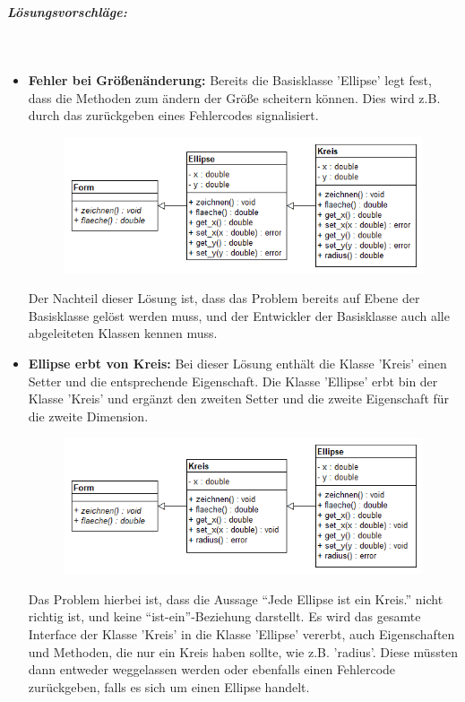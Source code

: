 				\subparagraph*{Lösungsvorschläge:}\mbox{}\\
					\begin{itemize}
						\item {\bfseries Fehler bei Größenänderung:}
							Bereits die Basisklasse 'Ellipse' legt fest, dass die Methoden zum ändern der Größe scheitern
							können. Dies wird z.B. durch das zurückgeben eines Fehlercodes signalisiert.
							\begin{figure}[H]
								\includegraphics[scale=0.6]{polymorphie/universell/vererbung/ellipse-kreis-problem/loesungen/fehler_bei_groessenaenderung.png}
							\end{figure}
							Der Nachteil dieser Lösung ist, dass das Problem bereits auf Ebene der Basisklasse gelöst werden
							muss, und der Entwickler der Basisklasse auch alle abgeleiteten Klassen kennen muss.
							
						\item {\bfseries Ellipse erbt von Kreis:}
							Bei dieser Lösung enthält die Klasse 'Kreis' einen Setter und die entsprechende Eigenschaft. Die
							Klasse 'Ellipse' erbt bin der Klasse 'Kreis' und ergänzt den zweiten Setter und die zweite
							Eigenschaft für die zweite Dimension.
							\begin{figure}[H]
								\includegraphics[scale=0.6]{polymorphie/universell/vererbung/ellipse-kreis-problem/loesungen/ellipse_erbt_von_kreis.png}
							\end{figure}
							Das Problem hierbei ist, dass die Aussage ``Jede Ellipse
							ist ein Kreis.'' nicht richtig ist, und keine ``ist-ein''-Beziehung darstellt. Es wird das
							gesamte Interface der Klasse 'Kreis' in die Klasse 'Ellipse' vererbt, auch Eigenschaften und
							Methoden, die nur ein Kreis haben sollte, wie z.B. 'radius'. Diese müssten dann entweder
							weggelassen werden oder ebenfalls einen Fehlercode zurückgeben, falls es sich um einen Ellipse
							handelt.
							

\end{itemize}
